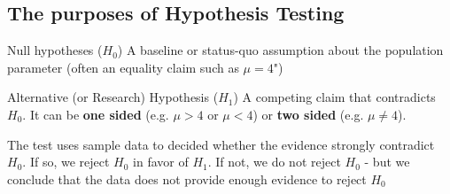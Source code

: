 \documentclass[10pt]{extarticle}
\begin{document}
\subsection{The purposes of Hypothesis Testing}
\begin{definitionbox}{Null hypotheses ($H_0$)}{}
    A baseline or status-quo assumption about the population parameter (often an equality claim such as $\mu = 4$")
\end{definitionbox}
\begin{definitionbox}{Alternative (or Research) Hypothesis ($H_1$)}{}
    A competing claim that contradicts $H_0$. It can be \textbf{one sided} (e.g. $\mu > 4$ or $\mu < 4$) or \textbf{two sided} (e.g. $\mu \neq 4$).
\end{definitionbox}
\noindent The test uses sample data to decided whether the evidence strongly contradict $H_0$. If so, we reject $H_0$ in favor of $H_1$. If not, we do not reject $H_0$ - but we conclude that  the data does not provide enough evidence to reject $H_0$
\end{document}
